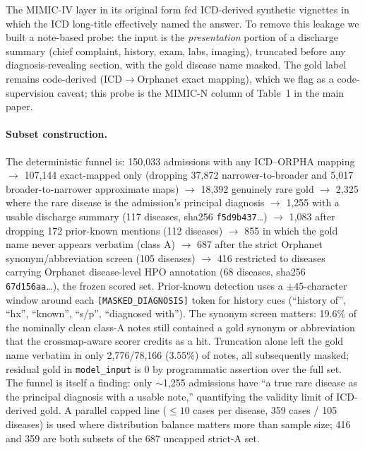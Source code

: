 \documentclass[letterpaper]{article} %
\begin{document}
The MIMIC-IV layer in its original form fed ICD-derived synthetic vignettes in
which the ICD long-title effectively named the answer. To remove this leakage we
built a note-based probe: the input is the \emph{presentation} portion of a
discharge summary (chief complaint, history, exam, labs, imaging), truncated
before any diagnosis-revealing section, with the gold disease name masked. The
gold label remains code-derived (ICD$\rightarrow$Orphanet exact mapping), which we
flag as a code-supervision caveat; this probe is the MIMIC-N column of
Table~1 in the main paper.

\paragraph{Subset construction.}
The deterministic funnel is: 150,033 admissions with any ICD--ORPHA mapping
$\rightarrow$ 107,144 exact-mapped only (dropping 37,872 narrower-to-broader and
5,017 broader-to-narrower approximate maps) $\rightarrow$ 18,392 genuinely rare
gold $\rightarrow$ 2,325 where the rare disease is the admission's principal
diagnosis $\rightarrow$ 1,255 with a usable discharge summary (117 diseases,
sha256 \texttt{f5d9b437}\ldots) $\rightarrow$ 1,083 after dropping 172
prior-known mentions (112 diseases) $\rightarrow$ 855 in which the gold name
never appears verbatim (class A) $\rightarrow$ 687 after the strict Orphanet
synonym/abbreviation screen (105 diseases) $\rightarrow$ 416 restricted to
diseases carrying Orphanet disease-level HPO annotation (68 diseases, sha256
\texttt{67d156aa}\ldots), the frozen scored set. Prior-known detection uses a
$\pm45$-character window around each \texttt{[MASKED\_DIAGNOSIS]} token for
history cues (``history of'', ``hx'', ``known'', ``s/p'', ``diagnosed with'').
The synonym screen matters: 19.6\% of the nominally clean class-A notes still
contained a gold synonym or abbreviation that the crossmap-aware scorer credits
as a hit. Truncation alone left the gold name verbatim in only 2,776/78,166
(3.55\%) of notes, all subsequently masked; residual gold in
\texttt{model\_input} is 0 by programmatic assertion over the full set. The
funnel is itself a finding: only $\sim$1,255 admissions have ``a true rare
disease as the principal diagnosis with a usable note,'' quantifying the
validity limit of ICD-derived gold. A parallel capped line (${\leq}10$ cases per
disease, 359 cases / 105 diseases) is used where distribution balance matters
more than sample size; 416 and 359 are both subsets of the 687 uncapped
strict-A set.
\end{document}
